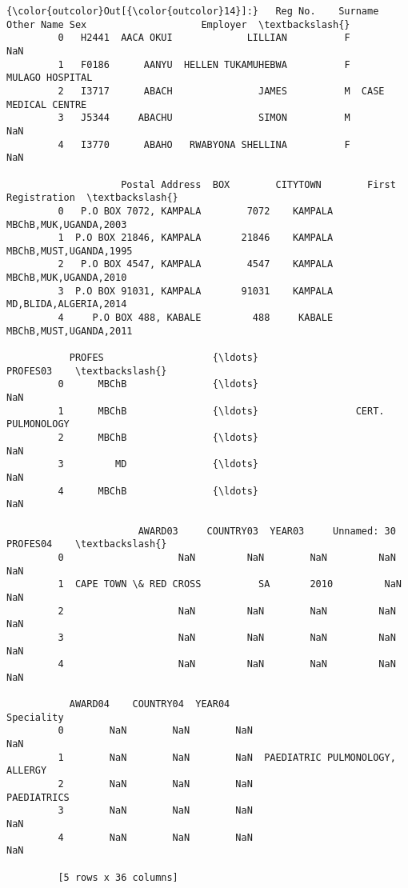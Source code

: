 \documentclass[11pt]{article}
\begin{document}
\begin{Verbatim}[commandchars=\\\{\}]
{\color{outcolor}Out[{\color{outcolor}14}]:}   Reg No.    Surname          Other Name Sex                    Employer  \textbackslash{}
         0   H2441  AACA OKUI             LILLIAN          F                  NaN   
         1   F0186      AANYU  HELLEN TUKAMUHEBWA          F      MULAGO HOSPITAL   
         2   I3717      ABACH               JAMES          M  CASE MEDICAL CENTRE   
         3   J5344     ABACHU               SIMON          M                  NaN   
         4   I3770      ABAHO   RWABYONA SHELLINA          F                  NaN   
         
                    Postal Address  BOX        CITYTOWN        First Registration  \textbackslash{}
         0   P.O BOX 7072, KAMPALA        7072    KAMPALA   MBChB,MUK,UGANDA,2003   
         1  P.O BOX 21846, KAMPALA       21846    KAMPALA  MBChB,MUST,UGANDA,1995   
         2   P.O BOX 4547, KAMPALA        4547    KAMPALA   MBChB,MUK,UGANDA,2010   
         3  P.O BOX 91031, KAMPALA       91031    KAMPALA   MD,BLIDA,ALGERIA,2014   
         4     P.O BOX 488, KABALE         488     KABALE  MBChB,MUST,UGANDA,2011   
         
           PROFES                   {\ldots}                        PROFES03    \textbackslash{}
         0      MBChB               {\ldots}                               NaN   
         1      MBChB               {\ldots}                 CERT. PULMONOLOGY   
         2      MBChB               {\ldots}                               NaN   
         3         MD               {\ldots}                               NaN   
         4      MBChB               {\ldots}                               NaN   
         
                       AWARD03     COUNTRY03  YEAR03     Unnamed: 30 PROFES04    \textbackslash{}
         0                    NaN         NaN        NaN         NaN        NaN   
         1  CAPE TOWN \& RED CROSS          SA       2010         NaN        NaN   
         2                    NaN         NaN        NaN         NaN        NaN   
         3                    NaN         NaN        NaN         NaN        NaN   
         4                    NaN         NaN        NaN         NaN        NaN   
         
           AWARD04    COUNTRY04  YEAR04                           Speciality  
         0        NaN        NaN        NaN                              NaN  
         1        NaN        NaN        NaN  PAEDIATRIC PULMONOLOGY, ALLERGY  
         2        NaN        NaN        NaN                      PAEDIATRICS  
         3        NaN        NaN        NaN                              NaN  
         4        NaN        NaN        NaN                              NaN  
         
         [5 rows x 36 columns]
\end{Verbatim}
            
\end{document}

